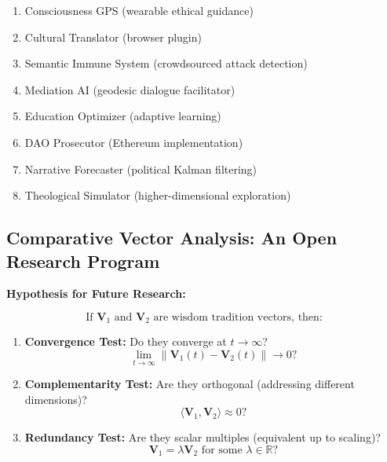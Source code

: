 \documentclass[11pt,a4paper]{article}
\theoremstyle{definition}
\theoremstyle{remark}
\newcommand{\RR}{\mathbb{R}}
\begin{document}
\begin{enumerate}[label=\textbf{T\arabic*:}]
\item Consciousness GPS (wearable ethical guidance)
\item Cultural Translator (browser plugin)
\item Semantic Immune System (crowdsourced attack detection)
\item Mediation AI (geodesic dialogue facilitator)
\item Education Optimizer (adaptive learning)
\item DAO Prosecutor (Ethereum implementation)
\item Narrative Forecaster (political Kalman filtering)
\item Theological Simulator (higher-dimensional exploration)
\end{enumerate}


\subsection{Comparative Vector Analysis: An Open Research Program}

\textbf{Hypothesis for Future Research:}

\begin{equation}
\text{If } \mathbf{V}_1 \text{ and } \mathbf{V}_2 \text{ are wisdom tradition vectors, then:}
\end{equation}

\begin{enumerate}
\item \textbf{Convergence Test:} Do they converge at $t \to \infty$?
\begin{equation}
\lim_{t \to \infty} \|\mathbf{V}_1(t) - \mathbf{V}_2(t)\| \to 0 ?
\end{equation}

\item \textbf{Complementarity Test:} Are they orthogonal (addressing different dimensions)?
\begin{equation}
\langle \mathbf{V}_1, \mathbf{V}_2 \rangle \approx 0 ?
\end{equation}

\item \textbf{Redundancy Test:} Are they scalar multiples (equivalent up to scaling)?
\begin{equation}
\mathbf{V}_1 = \lambda \mathbf{V}_2 \text{ for some } \lambda \in \RR ?
\end{equation}
\end{enumerate}
\end{document}
